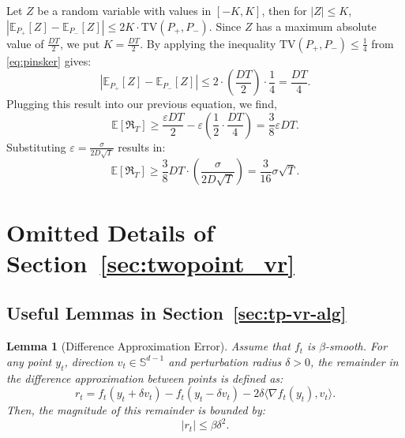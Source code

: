 \documentclass[journal,onecolumn]{IEEEtran}
\theoremstyle{plain}
\newtheorem{lemma}[theorem]{Lemma}
\theoremstyle{definition}
\theoremstyle{remark}
\newcommand{\regret}{\mathfrak{R}}
\begin{document}
{Let $Z$ be a random variable with values in $[-K,K]$, then for $|Z|\leq K$, $|\mathbb{E}_{P_+}[Z]-\mathbb{E}_{P_-}\left[Z\right]|\leq 2K\cdot\mathrm{TV}(P_+,P_-)$. Since $Z$ has a maximum absolute value of $\frac{DT}{2}$, we put $K=\frac{DT}{2}$. By applying the inequality $\mathrm{TV}(P_+,P_-) \leq \frac{1}{4}$ from \eqref{eq:pinsker} gives:
\begin{equation*}
\left|\mathbb{E}_{P_+}[Z]-\mathbb{E}_{P_-}\left[Z\right]\right| \leq 2\cdot\left(\frac{DT}{2}\right)\cdot \frac{1}{4} = \frac{DT}{4}.
\end{equation*}
Plugging this result into our previous equation, we find,
\begin{equation*}
\mathbb{E}[\regret_T] \ge \frac{\varepsilon D T}{2} - \varepsilon\left(\frac{1}{2}\cdot\frac{DT}{4}\right) = \frac{3}{8}\varepsilon D T.
\end{equation*}
Substituting $\varepsilon = \frac{\sigma}{2D\sqrt{T}}$ results in:
\begin{equation*}
\mathbb{E}[\regret_T] \geq \frac{3}{8}D T\cdot\left(\frac{\sigma}{2D\sqrt{T}}\right) = \frac{3}{16}\sigma\sqrt{T}.
\end{equation*}
\section{Omitted Details of Section~\ref{sec:twopoint_vr}}
\label{app:two_point}

\subsection{Useful Lemmas in Section~\ref{sec:tp-vr-alg}}

\begin{lemma}[Difference Approximation Error]
    \label{lem:smoothness-remainder} Assume that $f_{t}$ is $\beta$-smooth. For any point $y_{t}$,
    direction $v_{t}\in \mathbb{S}^{d-1}$ and perturbation radius $\delta > 0$, the remainder in the difference approximation between points is defined as:
    \begin{equation*}
        r_{t}= f_{t}(y_{t}+ \delta v_{t}) - f_{t}(y_{t}- \delta v_{t}) - 2\delta
        \langle \nabla f_{t}(y_{t}), v_{t}\rangle.
    \end{equation*}
    Then, the magnitude of this remainder is bounded by:
    \begin{equation*}
        |r_{t}| \le \beta \delta^{2}.
    \end{equation*}
\end{lemma}

}
\end{document}
